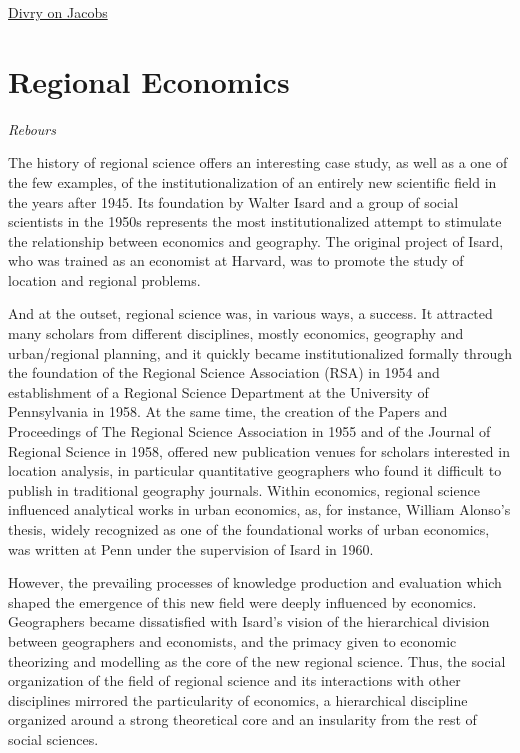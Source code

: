\documentclass[
]{book}
\begin{document}
\href{https://hscif.org/economists-in-the-city-divry/}{Divry on Jacobs}

\hypertarget{regional-economics}{%
\section{Regional Economics}\label{regional-economics}}

\emph{Rebours}

The history of regional science offers an interesting case study, as well as a one of the few examples, of the institutionalization of an entirely new scientific field in the years after 1945. Its foundation by Walter Isard and a group of social scientists in the 1950s represents the most institutionalized attempt to stimulate the relationship between economics and geography. The original project of Isard, who was trained as an economist at Harvard, was to promote the study of location and regional problems.

And at the outset, regional science was, in various ways, a success. It attracted many scholars from different disciplines, mostly economics, geography and urban/regional planning, and it quickly became institutionalized formally through the foundation of the Regional Science Association (RSA) in 1954 and establishment of a Regional Science Department at the University of Pennsylvania in 1958. At the same time, the creation of the Papers and Proceedings of The Regional Science Association in 1955 and of the Journal of Regional Science in 1958, offered new publication venues for scholars interested in location analysis, in particular quantitative geographers who found it difficult to publish in traditional geography journals. Within economics, regional science influenced analytical works in urban economics, as, for instance, William Alonso's thesis, widely recognized as one of the foundational works of urban economics, was written at Penn under the supervision of Isard in 1960.

However, the prevailing processes of knowledge production and evaluation which shaped the emergence of this new field were deeply influenced by economics. Geographers became dissatisfied with Isard's vision of the hierarchical division between geographers and economists, and the primacy given to economic theorizing and modelling as the core of the new regional science. Thus, the social organization of the field of regional science and its interactions with other disciplines mirrored the particularity of economics, a hierarchical discipline organized around a strong theoretical core and an insularity from the rest of social sciences.
\end{document}
